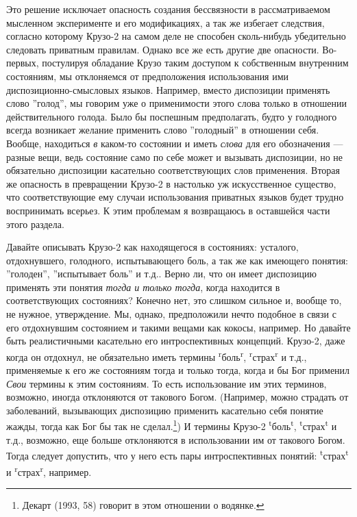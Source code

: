 \documentclass[11pt]{book}
\begin{document}
Это решение исключает опасность создания бессвязности в рассматриваемом мысленном эксперименте и его модификациях, а так же избегает следствия, согласно которому Крузо-2 на самом деле не способен сколь-нибудь убедительно следовать приватным правилам. Однако все же есть другие две опасности. Во-первых, постулируя обладание Крузо таким доступом к собственным внутренним состояниям, мы отклоняемся от предположения использования ими диспозиционно-смысловых языков. Например, вместо диспозиции применять слово ''голод'', мы говорим уже о применимости этого слова только в отношении действительного голода. Было бы поспешным предполагать, будто у голодного всегда возникает желание применить слово ''голодный'' в отношении себя. Вообще, находиться \textit{в} каком-то состоянии и иметь \textit{слова} для его обозначения --- разные вещи, ведь состояние само по себе может и вызывать диспозиции, но не обязательно диспозиции касательно соответствующих слов применения. Вторая же опасность в превращении Крузо-2 в настолько уж искусственное существо, что соответствующие ему случаи использования приватных языков будет трудно воспринимать всерьез. К этим проблемам я возвращаюсь в оставшейся части этого раздела.

Давайте описывать Крузо-2 как находящегося в состояниях: усталого, отдохнувшего, голодного, испытывающего боль, а так же как имеющего понятия: ''голоден'', ''испытывает боль'' и т.д.. Верно ли, что он имеет диспозицию применять эти понятия \textit{тогда и только тогда}, когда находится в соответствующих состояниях? Конечно нет, это слишком сильное и, вообще то, не нужное, утверждение. Мы, однако, предположили нечто подобное в связи с его отдохнувшим состоянием и такими вещами как кокосы, например. Но давайте быть реалистичными касательно его интроспективных концепций. Крузо-2, даже когда он отдохнул, не обязательно иметь термины \textsuperscript{r}боль\textsuperscript{r}, \textsuperscript{r}страх\textsuperscript{r} и т.д., применяемые к его же состояниям тогда и только тогда, когда и бы Бог применил \textit{Свои} термины к этим состояниям. То есть использование им этих терминов, возможно, иногда отклоняются от такового Богом. (Например, можно страдать от заболеваний, вызывающих диспозицию применить касательно себя понятие жажды, тогда как Бог бы так не сделал.\footnote{Декарт (1993, 58) говорит в этом отношении о водянке.}) И термины Крузо-2 \textsuperscript{t}боль\textsuperscript{t}, \textsuperscript{t}страх\textsuperscript{t} и т.д., возможно, еще больше отклоняются в использовании им от такового Богом. Тогда следует допустить, что у него есть пары интроспективных понятий: \textsuperscript{t}страх\textsuperscript{t} и \textsuperscript{r}страх\textsuperscript{r}, например.
\end{document}
